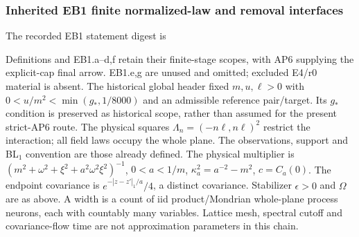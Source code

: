 \documentclass[11pt]{article}
\theoremstyle{plain}
\theoremstyle{definition}
\theoremstyle{remark}
\begin{document}
\subsubsection{Inherited EB1 finite normalized-law and removal interfaces}
The recorded EB1 statement digest is
\par{}\par
Definitions and EB1.a--d,f retain their finite-stage scopes, with AP6
supplying the explicit-cap final arrow. EB1.e,g are unused and omitted;
excluded E4/r0 material is absent. The historical global header fixed
$m,u,\ell>0$ with $0<u/m^2<\min(g_*,1/8000)$ and an admissible reference
pair/target. Its $g_*$ condition is preserved as historical scope, rather
than assumed for the present strict-AP6 route. The physical squares
$\Lambda_n=(-n\ell,n\ell)^2$ restrict the interaction; all field laws
occupy the whole plane. The observations, support and BL$_1$ convention
are those already defined. The physical multiplier is
$(m^2+\omega^2+\xi^2+a^2\omega^2\xi^2)^{-1}$, $0<a<1/m$,
$\kappa_a^2=a^{-2}-m^2$, $c=C_a(0)$. The endpoint covariance is
$e^{-|z-z'|_1/a}/4$, a distinct covariance. Stabilizer $\epsilon>0$ and
$\Omega$ are as above. A width is a count of iid product/Mondrian whole-plane
process neurons, each with countably many variables. Lattice mesh,
spectral cutoff and covariance-flow time are not approximation parameters
in this chain.
\end{document}
